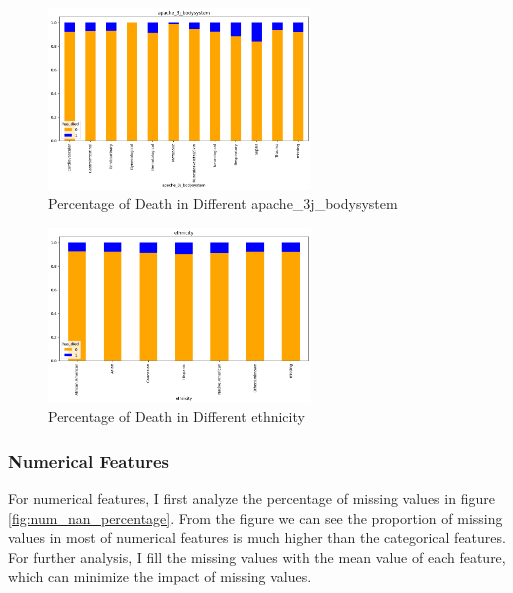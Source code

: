 \documentclass[a4paper, oneside, final, 12pt]{scrartcl} %
\begin{document}
\begin{figure}[ht]
  \centering
  \includegraphics[width=0.62\textwidth]{"./image/dataset/apache_3j_dis.png"}
  \caption{Percentage of Death in Different apache\_3j\_bodysystem}
  \label{fig:apache_3j}
\end{figure}

\begin{figure}[!b]
  \centering
  \includegraphics[width=0.62\textwidth]{"./image/dataset/ethnicity_dis.png"}
  \caption{Percentage of Death in Different ethnicity}
  \label{fig:ethnicity}
\end{figure}

\newpage

\subsubsection{Numerical Features}

For numerical features, I first analyze the percentage of 
missing values in figure \ref{fig:num_nan_percentage}.
From the figure we can see the proportion of missing values in most of numerical features
is much higher than the categorical features.
For further analysis, I fill the missing values with the mean value of each feature,
which can minimize the impact of missing values.
\end{document}
